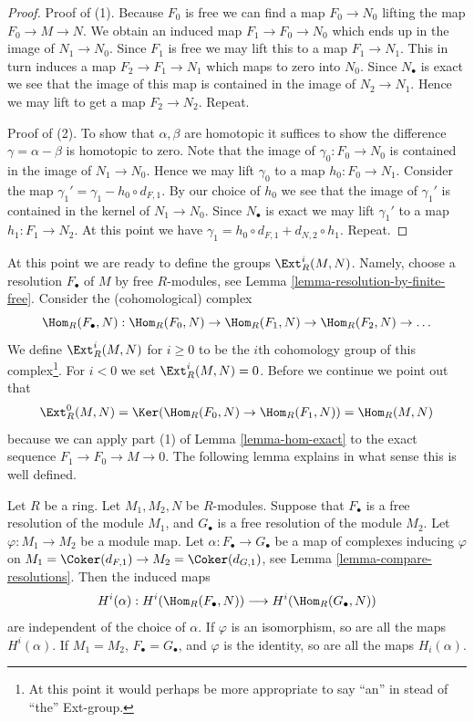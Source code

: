 \begin{proof}
Proof of (1). Because $F_0$ is free we can find a map $F_0 \to N_0$
lifting the map $F_0 \to M \to N$. We obtain an induced
map $F_1 \to F_0 \to N_0$ which ends up in the image
of $N_1 \to N_0$. Since $F_1$ is free we may lift this
to a map $F_1 \to N_1$. This in turn induces a map
$F_2 \to F_1 \to N_1$ which maps to zero into
$N_0$. Since $N_\bullet$ is exact we see that
the image of this map is contained in the image
of $N_2 \to N_1$. Hence we may lift to get a map
$F_2 \to N_2$. Repeat.

\medskip\noindent
Proof of (2). To show that $\alpha, \beta$ are homotopic it suffices
to show the difference $\gamma = \alpha - \beta$ is homotopic
to zero. Note that the image of $\gamma_0 : F_0 \to N_0$
is contained in the image of $N_1 \to N_0$. Hence we may lift
$\gamma_0$ to a map $h_0 : F_0 \to N_1$. Consider the map
$\gamma_1' = \gamma_1 - h_0 \circ d_{F, 1}$. By our choice of $h_0$
we see that the image of $\gamma_1'$ is contained in
the kernel of $N_1 \to N_0$. Since $N_\bullet$ is exact
we may lift $\gamma_1'$ to a map $h_1 : F_1 \to N_2$.
At this point we have $\gamma_1 = h_0 \circ d_{F, 1}
+ d_{N, 2} \circ h_1$. Repeat.
\end{proof}

\noindent
At this point we are ready to define the groups
$\Ext^i_R(M, N)$. Namely, choose a resolution
$F_{\bullet}$ of $M$ by free $R$-modules, see Lemma
\ref{lemma-resolution-by-finite-free}. Consider
the (cohomological) complex
$$
\Hom_R(F_\bullet, N) :
\Hom_R(F_0, N) \to
\Hom_R(F_1, N) \to
\Hom_R(F_2, N) \to \ldots
$$
We define $\Ext^i_R(M, N)$ for $i \geq 0$ to be the $i$th
cohomology group of this complex\footnote{At this point
it would perhaps be more appropriate to say ``an'' in stead
of ``the'' Ext-group.}. For $i < 0$ we set $\Ext^i_R(M, N) = 0$.
Before we continue we point out that
$$
\Ext^0_R(M, N) = \Ker(\Hom_R(F_0, N) \to \Hom_R(F_1, N)) =
\Hom_R(M, N)
$$
because we can apply part (1) of Lemma \ref{lemma-hom-exact} to
the exact sequence $F_1 \to F_0 \to M \to 0$.
The following lemma explains
in what sense this is well defined.

\begin{lemma}
\label{lemma-ext-welldefined}
Let $R$ be a ring. Let $M_1, M_2, N$ be $R$-modules.
Suppose that $F_{\bullet}$ is a free resolution of the module $M_1$,
and $G_{\bullet}$ is a free resolution of the module $M_2$.
Let $\varphi : M_1 \to M_2$ be a module map.
Let $\alpha : F_{\bullet} \to G_{\bullet}$ be
a map of complexes inducing $\varphi$ on
$M_1 = \Coker(d_{F, 1}) \to M_2 = \Coker(d_{G, 1})$,
see Lemma \ref{lemma-compare-resolutions}.
Then the induced maps
$$
H^i(\alpha) :
H^i(\Hom_R(F_{\bullet}, N))
\longrightarrow
H^i(\Hom_R(G_{\bullet}, N))
$$
are independent of the choice of $\alpha$.
If $\varphi$ is an isomorphism, so are all the maps
$H^i(\alpha)$. If $M_1 = M_2$, $F_\bullet = G_\bullet$, and
$\varphi$ is the identity, so are all the maps $H_i(\alpha)$.
\end{lemma}

